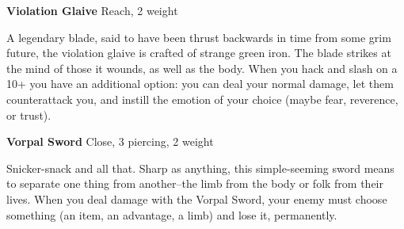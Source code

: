 {\noindent \bfseries Violation Glaive} \hspace*{\fill} Reach, 2 weight

A legendary blade, said to have been thrust backwards in time from some grim future, the violation glaive is crafted of strange green iron. The blade strikes at the mind of those it wounds, as well as the body. When you hack and slash on a 10+ you have an additional option: you can deal your normal damage, let them counterattack you, and instill the emotion of your choice (maybe fear, reverence, or trust).

{\noindent \bfseries Vorpal Sword} \hspace*{\fill} Close, 3 piercing, 2 weight

Snicker-snack and all that. Sharp as anything, this simple-seeming sword means to separate one thing from another--the limb from the body or folk from their lives. When you deal damage with the Vorpal Sword, your enemy must choose something (an item, an advantage, a limb) and lose it, permanently.


